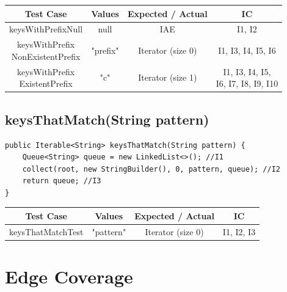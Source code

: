 \documentclass[12pt]{article}
\begin{document}
\begin{table}[htb]
\centering
\begin{tabular}{| c | c | c | c |} 
 \hline
 Test Case & Values & Expected / Actual & IC\\ \hline
 keysWithPrefixNull & null & IAE & I1, I2 \\ \hline
 \makecell{keysWithPrefix\\NonExistentPrefix} & "prefix" & Iterator (size 0) & I1, I3, I4, I5, I6 \\ \hline
 \makecell{keysWithPrefix\\ExistentPrefix} & "c" & Iterator (size 1) & \makecell{I1, I3, I4, I5, \\ I6, I7, I8, I9, I10} \\ \hline
\end{tabular}
\end{table}


\subsection{keysThatMatch(String pattern)}
\begin{lstlisting}
public Iterable<String> keysThatMatch(String pattern) {
    Queue<String> queue = new LinkedList<>(); //I1
    collect(root, new StringBuilder(), 0, pattern, queue); //I2
    return queue; //I3
}
\end{lstlisting}

\begin{table}[htb]
\centering
\begin{tabular}{| c | c | c | c |} 
 \hline
 Test Case & Values & Expected / Actual & IC\\ \hline
 keysThatMatchTest & "pattern" & Iterator (size 0) & I1, I2, I3 \\ \hline
\end{tabular}
\end{table}



\section{Edge Coverage}
\end{document}
